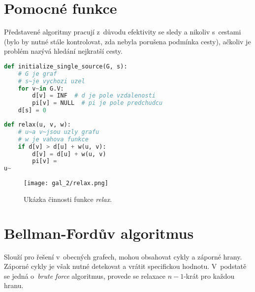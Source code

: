 
\section{Pomocné funkce}

Představené algoritmy pracují z~důvodu efektivity se sledy a nikoliv s~cestami (bylo by nutné stále kontrolovat, zda nebyla porušena podmínka cesty), ačkoliv je problém nazývá hledání nejkratší cesty.

\bigskip\noindent\begin{minipage}{\linewidth}
\begin{lstlisting}[language=Python, caption={Pomocná inicializační funkce. Složitost je $\Theta(n)$, kde $n$ je počet uzlů.}]
def initialize_single_source(G, s):
    # G je graf
    # s~je vychozi uzel
    for v~in G.V:
        d[v] = INF  # d je pole vzdalenosti
        pi[v] = NULL  # pi je pole predchudcu
    d[s] = 0
\end{lstlisting}
\end{minipage}

\noindent\begin{minipage}{\linewidth}
\begin{lstlisting}[language=Python, caption={Pomocná funkce \textit{relax}. Složitost je $O(1)$.}]
def relax(u, v, w):
    # u~a v~jsou uzly grafu
    # w je vahova funkce
    if d[v] > d[u] + w(u, v):
        d[v] = d[u] + w(u, v)
        pi[v] =
u~\end{lstlisting}
\end{minipage}

\begin{figure}[H]
    \centering
    \texttt{[image: gal\_2/relax.png]}
    \caption{Ukázka činnosti funkce \textit{relax}.}
\end{figure}


\section{Bellman-Fordův algoritmus}

Slouží pro řešení v~obecných grafech, mohou obsahovat cykly a záporné hrany. Záporné cykly je však nutné detekovat a vrátit specifickou hodnotu. V~podstatě se jedná o~\textit{brute force} algoritmus, provede se relaxace $n-1$-krát pro každou hranu.

